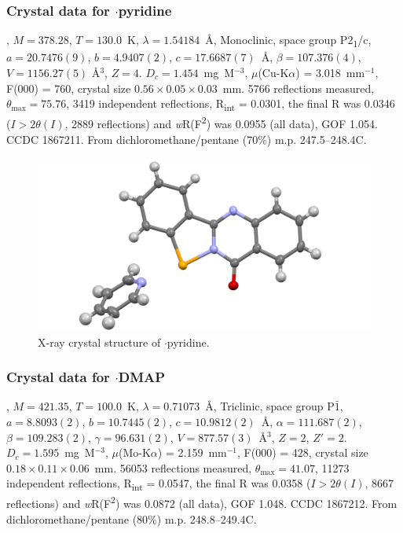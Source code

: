 \begin{refsection}
\subsubsection{Crystal data for \texorpdfstring{$ \cdot $pyridine}{C19H13N3OSe}}
, $M=378.28$, $T=130.0$~K, $\lambda=1.54184$~\AA, Monoclinic, space group P2\textsubscript{1}/c, $a = 20.7476(9)$, $b = 4.9407(2)$, $c = 17.6687(7)$~\AA, $\beta = 107.376(4)$\degree, $V = 1156.27(5)$ \AA$^{3}$, $Z = 4$.
$D_{c} = 1.454$~mg~M$^{-3}$, $\mu$(Cu-K$\alpha$) = 3.018~mm$^{-1}$, F(000) = 760, crystal size $0.56 \times 0.05 \times 0.03$~mm.
5766 reflections measured, $\theta_{\max} = 75.76$\degree, 3419 independent reflections, R\textsubscript{int} = 0.0301, the final R was 0.0346 ($I > 2\theta(I)$, 2889 reflections) and \textit{w}R(F\textsuperscript{2}) was 0.0955 (all data), GOF 1.054.
CCDC 1867211.
From dichloromethane/pentane (70\%) m.p. 247.5--248.4\degree{}C.

\begin{figure}
  \includegraphics[width=0.6\linewidth]{Figures/tetracycle-py-xtal.pdf}
  \caption{X-ray crystal structure of \texorpdfstring{$ \cdot $pyridine}{C19H13N3OSe}.}
\end{figure}

\subsubsection{Crystal data for \texorpdfstring{$ \cdot $DMAP}{C21H18N4OSe}}
, $M = 421.35$, $T=100.0$~K, $ \lambda=0.71073 $~\AA, Triclinic, space group P$\bar{1}$, $a = 8.8093(2)$, $b = 10.7445(2)$, $c = 10.9812(2)$~\AA, $\alpha = 111.687(2)$\degree, $\beta = 109.283(2)$\degree, $\gamma = 96.631(2)$\degree, $V = 877.57(3)$~\AA$^{3}$, $Z = 2$, $Z\prime = 2$.
$D_{c}= 1.595$~mg~M$^{-3}$, $\mu$(Mo-K$\alpha$) = 2.159~mm$^{-1}$, F(000) = 428, crystal size $0.18 \times 0.11 \times 0.06$~mm.
56053 reflections measured, $\theta_{\max} = 41.07$\degree, 11273 independent reflections, R\textsubscript{int} = 0.0547, the final R was 0.0358 ($I > 2\theta(I)$, 8667 reflections) and \textit{w}R(F\textsuperscript{2}) was 0.0872 (all data), GOF 1.048.
CCDC 1867212.
From dichloromethane/pentane (80\%) m.p. 248.8--249.4\degree{}C.


\end{refsection}
